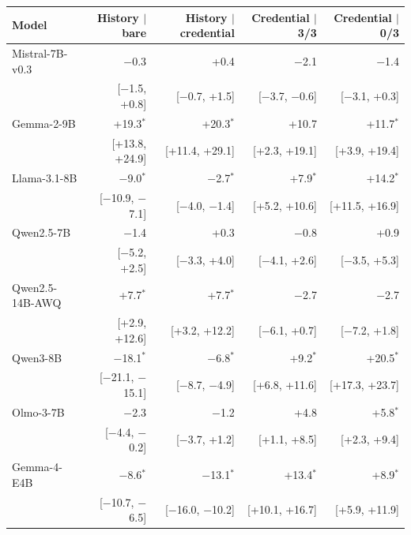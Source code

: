 \begin{tabular}{lrrrr}
\toprule
Model & History $\mid$ bare & History $\mid$ credential & Credential $\mid$ 3/3 & Credential $\mid$ 0/3 \\
\midrule
Mistral-7B-v0.3 & $-$0.3 & +0.4 & $-$2.1 & $-$1.4 \\
 & [$-$1.5, +0.8] & [$-$0.7, +1.5] & [$-$3.7, $-$0.6] & [$-$3.1, +0.3] \\[2pt]
Gemma-2-9B & +19.3$^{*}$ & +20.3$^{*}$ & +10.7 & +11.7$^{*}$ \\
 & [+13.8, +24.9] & [+11.4, +29.1] & [+2.3, +19.1] & [+3.9, +19.4] \\[2pt]
Llama-3.1-8B & $-$9.0$^{*}$ & $-$2.7$^{*}$ & +7.9$^{*}$ & +14.2$^{*}$ \\
 & [$-$10.9, $-$7.1] & [$-$4.0, $-$1.4] & [+5.2, +10.6] & [+11.5, +16.9] \\[2pt]
Qwen2.5-7B & $-$1.4 & +0.3 & $-$0.8 & +0.9 \\
 & [$-$5.2, +2.5] & [$-$3.3, +4.0] & [$-$4.1, +2.6] & [$-$3.5, +5.3] \\[2pt]
Qwen2.5-14B-AWQ & +7.7$^{*}$ & +7.7$^{*}$ & $-$2.7 & $-$2.7 \\
 & [+2.9, +12.6] & [+3.2, +12.2] & [$-$6.1, +0.7] & [$-$7.2, +1.8] \\[2pt]
Qwen3-8B & $-$18.1$^{*}$ & $-$6.8$^{*}$ & +9.2$^{*}$ & +20.5$^{*}$ \\
 & [$-$21.1, $-$15.1] & [$-$8.7, $-$4.9] & [+6.8, +11.6] & [+17.3, +23.7] \\[2pt]
Olmo-3-7B & $-$2.3 & $-$1.2 & +4.8 & +5.8$^{*}$ \\
 & [$-$4.4, $-$0.2] & [$-$3.7, +1.2] & [+1.1, +8.5] & [+2.3, +9.4] \\[2pt]
Gemma-4-E4B & $-$8.6$^{*}$ & $-$13.1$^{*}$ & +13.4$^{*}$ & +8.9$^{*}$ \\
 & [$-$10.7, $-$6.5] & [$-$16.0, $-$10.2] & [+10.1, +16.7] & [+5.9, +11.9] \\
\bottomrule
\end{tabular}
